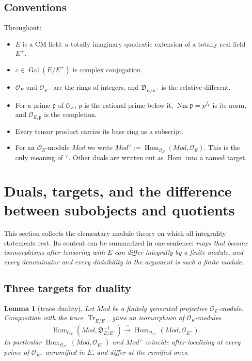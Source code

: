 \documentclass[11pt]{amsart}
\newtheorem{lemma}[theorem]{Lemma}
\theoremstyle{definition}
\theoremstyle{remark}
\newcommand{\OEring}{\mathcal{O}_E}
\newcommand{\OEp}{\mathcal{O}_{E^+}}
\newcommand{\Md}{\mathit{Mod}}
\DeclareMathOperator{\Hom}{Hom}
\DeclareMathOperator{\Nm}{Nm}
\DeclareMathOperator{\Tr}{Tr}
\DeclareMathOperator{\Gal}{Gal}
\newcommand{\pp}{\mathfrak{p}}
\newcommand{\Diff}{\mathfrak{D}_{E/E^+}}
\newcommand{\dual}{^{\vee}}
\begin{document}
\subsection{Conventions}\label{subsec:conventions}
Throughout:
\begin{itemize}
\item $E$ is a CM field: a totally imaginary quadratic extension of a totally real field $E^{+}$.
\item $c\in\Gal(E/E^+)$ is complex conjugation.
\item $\OEring$ and $\OEp$ are the rings of integers, and $\Diff$ is the relative different.
\item For a prime $\pp$ of $\OEring$, $p$ is the rational prime below it, $\Nm\pp=p^{f_\pp}$ is its norm, and $\mathcal{O}_{E,\pp}$ is the completion.
\item Every tensor product carries its base ring as a subscript.
\item For an $\OEring$-module $\Md$ we write $\Md\dual:=\Hom_{\OEring}(\Md,\OEring)$. This is the only meaning of $^\vee$. Other duals are written out as $\Hom$ into a named target.
\end{itemize}

\section{Duals, targets, and the difference between subobjects and quotients}\label{sec:duals}

This section collects the elementary module theory on which all integrality statements rest. Its content can be summarized in one sentence: \emph{maps that become isomorphisms after tensoring with $E$ can differ integrally by a finite module, and every denominator and every divisibility in the argument is such a finite module.}

\subsection{Three targets for duality}

\begin{lemma}[trace duality]\label{lem:trace-dual}
Let $\Md$ be a finitely generated projective $\OEring$-module. Composition with the trace $\Tr_{E/E^+}$ gives an isomorphism of $\OEring$-modules
\[
\Hom_{\OEring}(\Md,\Diff^{-1})\xrightarrow{\ \sim\ }\Hom_{\OEp}(\Md,\OEp).
\]
In particular $\Hom_{\OEp}(\Md,\OEp)$ and $\Md\dual$ coincide after localizing at every prime of $\OEp$ unramified in $E$, and differ at the ramified ones.
\end{lemma}
\end{document}
